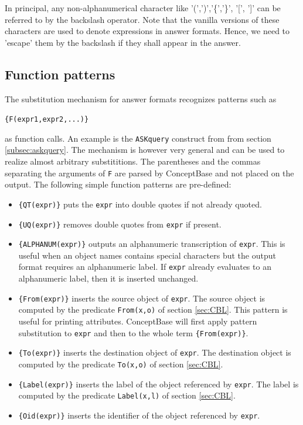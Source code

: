 \vspace{0.5cm}
In principal, any non-alphanumerical character like '(',')','\{','\}',
'[', ']' can be referred to by the backslash operator. Note that the
vanilla versions of these characters are used to denote expressions in
answer formats. Hence, we need to 'escape' them by the backslash if they
shall appear in the answer.


\subsection{Function patterns}
\label{subsec:externalproc}

The substitution mechanism for answer formats recognizes patterns such as

   \verb+{F(expr1,expr2,...)}+ 

as function calls. An example is the {\tt ASKquery}  construct from from section \ref{subsec:askquery}.
The mechanism is however very general and can be used to realize almost arbitrary substititions.
The parentheses and the commas separating the arguments of {\tt F} are parsed by ConceptBase
and not placed on the output.
The following simple function patterns are pre-defined:

\begin{itemize}

\item \verb+{QT(expr)}+ puts the {\tt expr} into double quotes if not already quoted. 

\item \verb+{UQ(expr)}+ removes double quotes from {\tt expr} if present.

\item \verb+{ALPHANUM(expr)}+ outputs an alphanumeric transcription of {\tt expr}.
This is useful when an object names contains special characters but the
output format requires an alphanumeric label. If {\tt expr} already
evaluates to an alphanumeric label, then it is inserted unchanged.

\item \verb+{From(expr)}+ inserts the source object of {\tt expr}. The source object is
computed by the predicate {\tt From(x,o)} of section \ref{sec:CBL}. This pattern
is useful for printing attributes. ConceptBase will first apply pattern substitution to
{\tt expr} and then to the whole term \verb+{From(expr)}+.

\item \verb+{To(expr)}+ inserts the destination object of {\tt expr}. The destination object is
computed by the predicate {\tt To(x,o)} of section \ref{sec:CBL}.

\item \verb+{Label(expr)}+ inserts the label of the object referenced by {\tt expr}. The label is
computed by the predicate {\tt Label(x,l)} of section \ref{sec:CBL}.

\item \verb+{Oid(expr)}+ inserts the identifier of the object referenced by {\tt expr}. 
\end{itemize}


